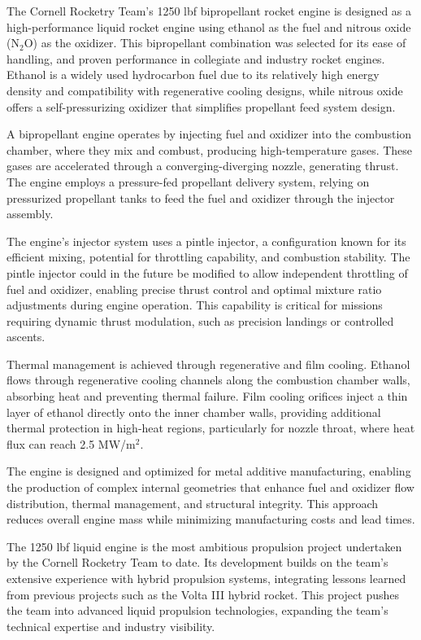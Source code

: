 The Cornell Rocketry Team's 1250 lbf bipropellant rocket engine is designed as a high-performance liquid rocket engine using ethanol as the fuel and nitrous oxide (N$_2$O) as the oxidizer. This bipropellant combination was selected for its ease of handling, and proven performance in collegiate and industry rocket engines. Ethanol is a widely used hydrocarbon fuel due to its relatively high energy density and compatibility with regenerative cooling designs, while nitrous oxide offers a self-pressurizing oxidizer that simplifies propellant feed system design.

A bipropellant engine operates by injecting fuel and oxidizer into the combustion chamber, where they mix and combust, producing high-temperature gases. These gases are accelerated through a converging-diverging nozzle, generating thrust. The engine employs a pressure-fed propellant delivery system, relying on pressurized propellant tanks to feed the fuel and oxidizer through the injector assembly.

The engine's injector system uses a pintle injector, a configuration known for its efficient mixing, potential for throttling capability, and combustion stability. The pintle injector could in the future be modified to allow independent throttling of fuel and oxidizer, enabling precise thrust control and optimal mixture ratio adjustments during engine operation. This capability is critical for missions requiring dynamic thrust modulation, such as precision landings or controlled ascents.

Thermal management is achieved through regenerative and film cooling. Ethanol flows through regenerative cooling channels along the combustion chamber walls, absorbing heat and preventing thermal failure. Film cooling orifices inject a thin layer of ethanol directly onto the inner chamber walls, providing additional thermal protection in high-heat regions, particularly for nozzle throat, where heat flux can reach 2.5 MW/m$^2$.

The engine is designed and optimized for metal additive manufacturing, enabling the production of complex internal geometries that enhance fuel and oxidizer flow distribution, thermal management, and structural integrity. This approach reduces overall engine mass while minimizing manufacturing costs and lead times.

The 1250 lbf liquid engine is the most ambitious propulsion project undertaken by the Cornell Rocketry Team to date. Its development builds on the team’s extensive experience with hybrid propulsion systems, integrating lessons learned from previous projects such as the Volta III hybrid rocket. This project pushes the team into advanced liquid propulsion technologies, expanding the team’s technical expertise and industry visibility.

